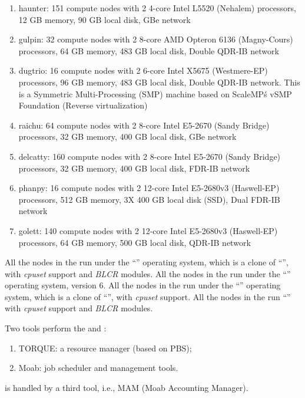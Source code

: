 \fi
\ifgent
  \begin{enumerate}
     compute nodes with 2 4-core Intel L5520 (Nehalem)
    processors, 12 GB memory, 90 GB local disk, GBe network
    \item  haunter: 151 compute nodes with 2 4-core Intel L5520 (Nehalem)
    processors, 12 GB memory, 90 GB local disk, GBe network
    \item  gulpin: 32 compute nodes with 2 8-core AMD Opteron 6136
    (Magny-Cours) processors, 64 GB memory, 483 GB local disk, Double QDR-IB
    network
    \item  dugtrio: 16 compute nodes with 2 6-core Intel X5675 (Westmere-EP)
    processors, 96 GB memory, 483 GB local disk, Double QDR-IB network. This is
    a Symmetric Multi-Processing (SMP) machine based on ScaleMP\'s vSMP
    Foundation (Reverse virtualization)
    \item  raichu: 64 compute nodes with 2 8-core Intel E5-2670 (Sandy Bridge)
    processors, 32 GB memory, 400 GB local disk, GBe network
    \item  delcatty: 160 compute nodes with 2 8-core Intel E5-2670 (Sandy
    Bridge) processors, 32 GB memory, 400 GB local disk, FDR-IB network
    \item  phanpy: 16 compute nodes with 2 12-core Intel E5-2680v3 (Haswell-EP)
    processors, 512 GB memory, 3X 400 GB local disk (SSD), Dual FDR-IB network
    \item  golett: 140 compute nodes with 2 12-core Intel E5-2680v3
    (Haswell-EP) processors, 64 GB memory, 500 GB local disk, QDR-IB network
    \end{enumerate}
\fi

\ifantwerpen
All the nodes in the \hpc run under the ``\operatingsystemSL'' operating
system, which is a clone of ``\operatingsystemRHEL'',
with \emph{cpuset} support and \emph{BLCR} modules.
\fi
\ifleuven
All the nodes in the \hpc run under the ``\operatingsystem'' operating system,
version 6.
\fi
\ifbrussel
All the nodes in the \hpc run under the ``\operatingsystemSL'' operating
system, which is a clone of ``\operatingsystemRHEL'',
with \emph{cpuset} support.
\fi
\ifgent
All the nodes in the \hpc run ``\operatingsystem''
with \emph{cpuset} support and \emph{BLCR} modules.
\fi

Two tools perform the  and :
\begin{enumerate}
  \item  TORQUE: a resource manager (based on PBS);
  \item  Moab: job scheduler and management tools.
\end{enumerate}
\ifantwerpen
\fi
\ifleuven
{} is handled by a third tool, i.e., MAM (Moab Accounting
Manager).
\fi

